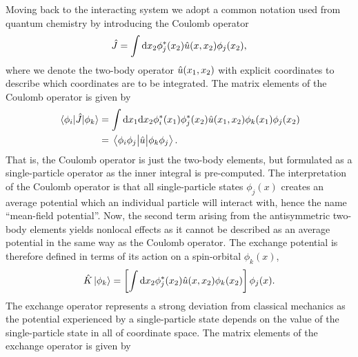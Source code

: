             Moving back to the interacting system we adopt a common notation
            used from quantum chemistry \cite{szabo1996modern} by introducing
            the Coulomb operator
            \begin{align}
                \hat{J}
                = \int \dd x_2
                \phi^{*}_j(x_2)\hat{u}(x, x_2)
                \phi_j(x_2),
                \label{eq:coulomb-operator}
            \end{align}
            where we denote the two-body operator $\hat{u}(x_1, x_2)$ with
            explicit coordinates to describe which coordinates are to be
            integrated.
            The matrix elements of the Coulomb operator is given by
            \begin{align}
                \mel{\phi_i}{\hat{J}}{\phi_k}
                &= \int\dd x_1\dd x_2
                \phi^{*}_i(x_1)\phi^{*}_j(x_2)
                \hat{u}(x_1, x_2)
                \phi_k(x_1)\phi_j(x_2)
                \\
                &=
                \mel{\phi_i\phi_j}{\hat{u}}{\phi_k\phi_j}.
            \end{align}
            That is, the Coulomb operator is just the two-body elements, but
            formulated as a single-particle operator as the inner integral is
            pre-computed.
            The interpretation of the Coulomb operator is that all
            single-particle states $\phi_j(x)$ creates an average potential
            which an individual particle will interact with, hence the name
            ``mean-field potential''.
            Now, the second term arising from the antisymmetric two-body
            elements yields nonlocal effects as it cannot be described as an
            average potential in the same way as the Coulomb operator.
            The exchange potential is therefore defined in terms of its action
            on a spin-orbital $\phi_k(x)$,
            \begin{align}
                \hat{K}\ket{\phi_k}
                = \left[ 
                    \int\dd x_2 \phi^{*}_j(x_2)\hat{u}(x, x_2)\phi_k(x_2)
                 \right]\phi_j(x).
                \label{eq:exchange-operator}
            \end{align}
            The exchange operator represents a strong deviation from classical
            mechanics as the potential experienced by a single-particle state
            depends on the value of the single-particle state in all of
            coordinate space.
            The matrix elements of the exchange operator is given by
